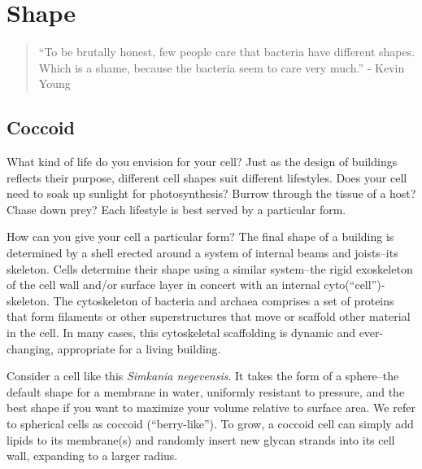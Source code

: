 \documentclass[]{tufte-book}
\begin{document}
\chapter{Shape}\label{shape}

\begin{quote}
``To be brutally honest, few people care that bacteria have different
shapes. Which is a shame, because the bacteria seem to care very much.''
- Kevin Young \citep{young2006}
\end{quote}

\section{Coccoid}\label{coccoid}

What kind of life do you envision for your cell? Just as the design of
buildings reflects their purpose, different cell shapes suit different
lifestyles. Does your cell need to soak up sunlight for photosynthesis?
Burrow through the tissue of a host? Chase down prey? Each lifestyle is
best served by a particular form.

How can you give your cell a particular form? The final shape of a
building is determined by a shell erected around a system of internal
beams and joists--its skeleton. Cells determine their shape using a
similar system--the rigid exoskeleton of the cell wall and/or surface
layer in concert with an internal cyto(``cell'')-skeleton. The
cytoskeleton of bacteria and archaea comprises a set of proteins that
form filaments or other superstructures that move or scaffold other
material in the cell. In many cases, this cytoskeletal scaffolding is
dynamic and ever-changing, appropriate for a living building.

Consider a cell like this \emph{Simkania negevensis}. It takes the form
of a sphere--the default shape for a membrane in water, uniformly
resistant to pressure, and the best shape if you want to maximize your
volume relative to surface area. We refer to spherical cells as coccoid
(``berry-like''). To grow, a coccoid cell can simply add lipids to its
membrane(s) and randomly insert new glycan strands into its cell wall,
expanding to a larger radius.
\end{document}
